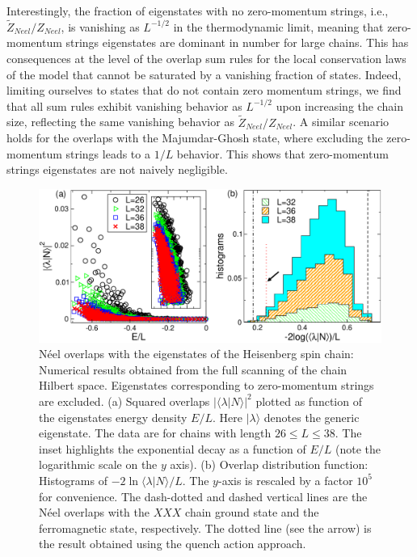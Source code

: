 \documentclass[11pt]{iopart}
\begin{document}
Interestingly, the fraction of eigenstates with no zero-momentum strings, i.e.,  
$\widetilde Z_{Neel}/Z_{Neel}$, is vanishing as $L^{-1/2}$ in the thermodynamic 
limit, meaning that zero-momentum strings eigenstates are dominant in number 
for large chains. This has consequences at the level of the overlap sum rules for the local conservation laws of 
the model that cannot be saturated by a vanishing fraction of states. 
Indeed, limiting ourselves to states that do not contain zero momentum strings, we find  that  all sum rules exhibit vanishing behavior as 
$L^{-1/2}$ upon increasing the chain size, reflecting the same vanishing behavior 
as $\widetilde Z_{Neel}/Z_{Neel}$. 
%
A similar scenario holds for the overlaps with 
the Majumdar-Ghosh state, where excluding the zero-momentum strings leads to a $1/L$ behavior. 
This shows that zero-momentum strings eigenstates are not naively negligible. 


\begin{figure}[t]
\begin{center}
\includegraphics[width=.9\textwidth]{Neel_overlaps}
\end{center}
\caption{ N\'eel overlaps with the eigenstates of the Heisenberg spin 
 chain: Numerical results obtained from the full scanning of the chain 
 Hilbert space. Eigenstates corresponding to zero-momentum strings are 
 excluded. (a) Squared overlaps $|\langle\lambda|N\rangle|^2$ plotted as 
 function of the eigenstates energy density $E/L$. Here $|\lambda\rangle$ 
 denotes the generic eigenstate. The data are for chains with length $26
 \le L\le 38$. The inset highlights the exponential decay as a 
 function of $E/L$ (note the logarithmic scale on the $y$ axis). (b) 
 Overlap distribution function: Histograms of $-2\ln\langle\lambda|N\rangle/L$. 
 The $y$-axis is rescaled by a factor $10^5$ for convenience. The dash-dotted 
 and dashed vertical lines are the N\'eel overlaps with the $XXX$ chain ground 
 state and the ferromagnetic state, respectively. The dotted line (see 
 the arrow) is the result obtained using the quench action approach. 
}
\label{fig0:Neel-ov}
\end{figure}
\end{document}
